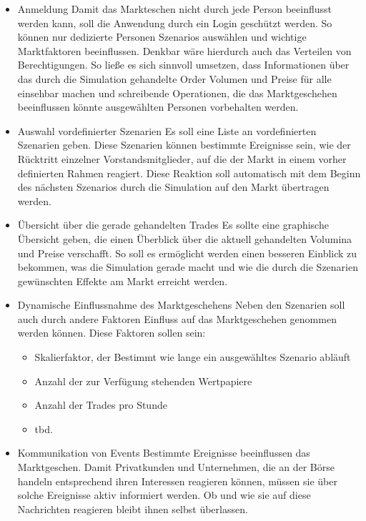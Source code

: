 	\begin{itemize}
		\item Anmeldung %
			Damit das Markteschen nicht durch jede Person beeinflusst werden kann, soll die Anwendung durch ein Login geschützt werden. So können nur dedizierte Personen Szenarios auswählen und wichtige Marktfaktoren beeinflussen. Denkbar wäre hierdurch auch das Verteilen von Berechtigungen. So ließe es sich sinnvoll umsetzen, dass Informationen über das durch die Simulation gehandelte Order Volumen und Preise für alle einsehbar machen und schreibende Operationen, die das Marktgeschehen beeinflussen könnte ausgewählten Personen vorbehalten werden.
			
		\item Auswahl vordefinierter Szenarien
			Es soll eine Liste an vordefinierten Szenarien geben. Diese Szenarien können bestimmte Ereignisse sein, wie der Rücktritt einzelner Vorstandsmitglieder, auf die der Markt in einem vorher definierten Rahmen reagiert. Diese Reaktion soll automatisch mit dem Beginn des nächsten Szenarios durch die Simulation auf den Markt übertragen werden.
			
		\item Übersicht über die gerade gehandelten Trades
			Es sollte eine graphische Übersicht geben, die einen Überblick über die aktuell gehandelten Volumina und Preise verschafft. So soll es ermöglicht werden einen besseren Einblick zu bekommen, was die Simulation gerade macht und wie die durch die Szenarien gewünschten Effekte am Markt erreicht werden.
			
		\item Dynamische Einflussnahme des Marktgeschehens
			Neben den Szenarien soll auch durch andere Faktoren Einfluss auf das Marktgeschehen genommen werden können. Diese Faktoren sollen sein:
				\begin{itemize}
					\item Skalierfaktor, der Bestimmt wie lange ein ausgewähltes Szenario abläuft
					\item Anzahl der zur Verfügung stehenden Wertpapiere
					\item Anzahl der Trades pro Stunde
					\item tbd.
				\end{itemize}
			
		\item Kommunikation von Events
			Bestimmte Ereignisse beeinflussen das Marktgeschen. Damit Privatkunden und Unternehmen, die an der Börse handeln entsprechend ihren Interessen reagieren können, müssen sie über solche Ereignisse aktiv informiert werden. Ob und wie sie auf diese Nachrichten reagieren bleibt ihnen selbst überlassen.
			

\end{itemize}
